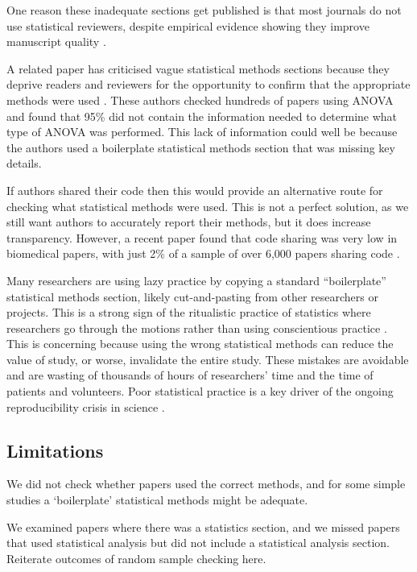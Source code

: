 \documentclass[12pt]{article}
\begin{document}
One reason these inadequate sections get published is that most journals
do not use statistical reviewers, despite empirical evidence showing
they improve manuscript quality \citep{Hardwicke2020}.

A related paper has criticised vague statistical methods sections
because they deprive readers and reviewers for the opportunity to
confirm that the appropriate methods were used \citep{Weissgerber2018}.
These authors checked hundreds of papers using ANOVA and found that 95\%
did not contain the information needed to determine what type of ANOVA
was performed. This lack of information could well be because the
authors used a boilerplate statistical methods section that was missing
key details.

If authors shared their code then this would provide an alternative
route for checking what statistical methods were used. This is not a
perfect solution, as we still want authors to accurately report their
methods, but it does increase transparency. However, a recent paper
found that code sharing was very low in biomedical papers, with just 2\%
of a sample of over 6,000 papers sharing code \citep{Serghiou2021}.

Many researchers are using lazy practice by copying a standard
``boilerplate'' statistical methods section, likely cut-and-pasting from
other researchers or projects. This is a strong sign of the ritualistic
practice of statistics where researchers go through the motions rather
than using conscientious practice \citep{Stark2018}. This is concerning
because using the wrong statistical methods can reduce the value of
study, or worse, invalidate the entire study. These mistakes are
avoidable and are wasting of thousands of hours of researchers' time and
the time of patients and volunteers. Poor statistical practice is a key
driver of the ongoing reproducibility crisis in science
\citep{Ioannidis2014}.

\hypertarget{limitations}{%
\subsection{Limitations}\label{limitations}}

We did not check whether papers used the correct methods, and for some
simple studies a `boilerplate' statistical methods might be adequate.

We examined papers where there was a statistics section, and we missed
papers that used statistical analysis but did not include a statistical
analysis section. Reiterate outcomes of random sample checking here.
\end{document}
